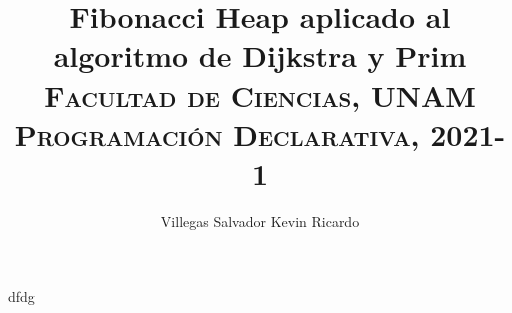 \documentclass[a4paper, titlepage, 12pt]{article}
\title{\textbf{Fibonacci Heap aplicado al algoritmo de Dijkstra y Prim}\\
  \vspace{2.5cm}
  \textsc{Facultad de Ciencias, UNAM}\\
  \normalsize\textsc{Programación Declarativa, 2021-1}
}
\author{ Villegas Salvador Kevin Ricardo }
\theoremstyle{definition}%
\theoremstyle{Teorema}
\theoremstyle{break}
\begin{document}
\maketitle

dfdg
\end{document}
